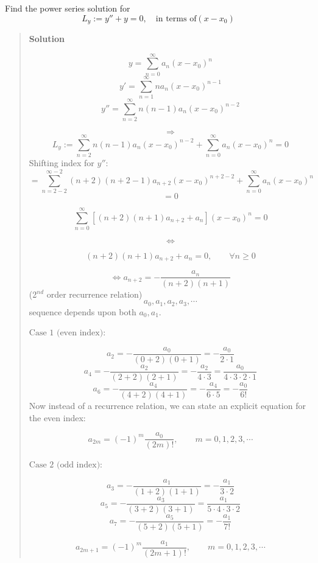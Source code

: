 \documentclass[
  letterpaper,
  DIV=11,
  numbers=noendperiod]{scrreprt}
\theoremstyle{plain}
\theoremstyle{remark}
\begin{document}
\begin{tcolorbox}[enhanced jigsaw, title=\textcolor{quarto-callout-tip-color}{\faLightbulb}\hspace{0.5em}{Example}, colbacktitle=quarto-callout-tip-color!10!white, opacitybacktitle=0.6, opacityback=0, rightrule=.15mm, breakable, titlerule=0mm, colback=white, bottomtitle=1mm, colframe=quarto-callout-tip-color-frame, toprule=.15mm, leftrule=.75mm, toptitle=1mm, arc=.35mm, bottomrule=.15mm, left=2mm, coltitle=black]

Find the power series solution for
\[L_y:=y''+y=0,\quad\text{in terms of}(x-x_0)\]

\begin{quote}
\textbf{Solution}

\[y=\sum_{n=0}^\infty a_n(x-x_0)^n\]
\[y'=\sum_{n=1}^\infty na_n(x-x_0)^{n-1}\]
\[y''=\sum_{n=2}^\infty n(n-1)a_n(x-x_0)^{n-2}\]

\[\Rightarrow\]
\[L_y:=\sum_{n=2}^\infty n(n-1)a_n(x-x_0)^{n-2}+\sum_{n=0}^\infty a_n(x-x_0)^n=0\]
Shifting index for \(y''\):
\[=\sum_{n=2-2}^{\infty-2} (n+2)(n+2-1)a_{n+2}(x-x_0)^{n+2-2}+\sum_{n=0}^\infty a_n(x-x_0)^n\]
\[=0\]

\[\sum_{n=0}^\infty \left[(n+2)(n+1)a_{n+2}+a_n\right](x-x_0)^n=0\]

\[\Leftrightarrow\]

\[(n+2)(n+1)a_{n+2}+a_n=0,\qquad \forall n\geq 0\]

\[\Leftrightarrow \boxed{a_{n+2}=-\frac{a_n}{(n+2)(n+1)}}\] (2\(^{nd}\)
order recurrence relation)\footnotemark{} \[a_0,a_1,a_2,a_3,\cdots\]
sequence depends upon both \(a_0,a_1\).

\(\boxed{\text{Case 1 (even index)}:}\)

\[ a_2=-\frac{a_0}{(0+2)(0+1)}=-\frac{a_0}{2\cdot 1}\]
\[a_4=-\frac{a_2}{(2+2)(2+1)}=-\frac{a_2}{4\cdot 3}=\frac{a_0}{4\cdot3\cdot 2\cdot 1}\]
\[a_6=-\frac{a_4}{(4+2)(4+1)}=-\frac{a_4}{6\cdot 5}=-\frac{a_0}{6!}\]
Now instead of a recurrence relation, we can state an explicit equation
for the even index:

\[\boxed{a_{2m}=(-1)^m\frac{a_0}{(2m)!},\qquad m=0,1,2,3,\cdots}\]\footnotemark{}

\(\boxed{\text{Case 2 (odd index)}:}\)

\[a_3=-\frac{a_1}{(1+2)(1+1)}=-\frac{a_1}{3\cdot 2}\]
\[a_5=-\frac{a_3}{(3+2)(3+1)}=\frac{a_1}{5\cdot 4\cdot 3\cdot 2}\]
\[a_7=-\frac{a_5}{(5+2)(5+1)}=-\frac{a_1}{7!}\]

\[\boxed{a_{2m+1}=(-1)^m\frac{a_1}{(2m+1)!},\qquad m=0,1,2,3,\cdots}\]


\end{quote}
\end{tcolorbox}
\end{document}
